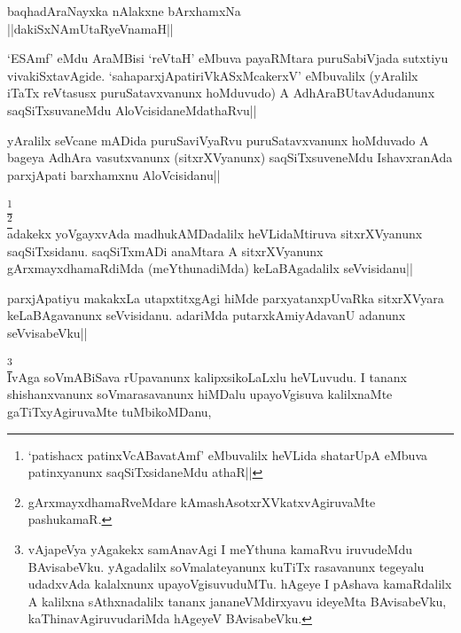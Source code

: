 \stext

\stext

\begin{center}
baqhadAraNayxka nAlakxne bArxhamxNa\\
||dakiSxNAmUtaRyeVnamaH||
\end{center}

\begin{artha}
`ESAmf' eMdu AraMBisi `reVtaH' eMbuva payaRMtara puruSabiVjada 
sutxtiyu vivakiSxtavAgide. `sahaparxjApatiriVkASxMcakerxV' eMbuvalilx 
(yAralilx iTaTx reVtasusx puruSatavxvanunx hoMduvudo) A 
AdhAraBUtavAdudanunx saqSiTxsuvaneMdu AloVcisidaneMdathaRvu||
\end{artha}


\begin{artha}
yAralilx seVcane mADida puruSaviVyaRvu puruSatavxvanunx hoMduvado A 
bageya AdhAra vasutxvanunx (sitxrXVyanunx) saqSiTxsuveneMdu 
IshavxranAda parxjApati barxhamxnu AloVcisidanu||
\end{artha}


\begin{artha}
\footnote[1]{`patishacx patinxVcABavatAmf' eMbuvalilx heVLida 
shatarUpA eMbuva patinxyanunx saqSiTxsidaneMdu athaR||}\\
\footnote[2]{gArxmayxdhamaRveMdare kAmashAsotxrXVkatxvAgiruvaMte 
pashukamaR.}\\
adakekx yoVgayxvAda madhukAMDadalilx heVLidaMtiruva sitxrXVyanunx 
saqSiTxsidanu. saqSiTxmADi anaMtara A sitxrXVyanunx 
gArxmayxdhamaRdiMda (meYthunadiMda) keLaBAgadalilx seVvisidanu||
\end{artha}


\begin{artha}
parxjApatiyu makakxLa utapxtitxgAgi hiMde parxyatanxpUvaRka 
sitxrXVyara keLaBAgavanunx seVvisidanu. adariMda putarxkAmiyAdavanU 
adanunx seVvisabeVku||
\end{artha}


\begin{artha}
\footnote[1]{vAjapeVya yAgakekx samAnavAgi I meYthuna kamaRvu 
iruvudeMdu BAvisabeVku. yAgadalilx soVmalateyanunx kuTiTx rasavanunx 
tegeyalu udadxvAda kalalxnunx upayoVgisuvuduMTu. hAgeye I pAshava 
kamaRdalilx A kalilxna sAthxnadalilx tananx jananeVMdirxyavu ideyeMta 
BAvisabeVku, kaThinavAgiruvudariMda hAgeyeV BAvisabeVku.}\\
IvAga soVmABiSava rUpavanunx kalipxsikoLaLxlu heVLuvudu. I tananx 
shishanxvanunx soVmarasavanunx hiMDalu upayoVgisuva kalilxnaMte 
gaTiTxyAgiruvaMte tuMbikoMDanu,
\end{artha}

